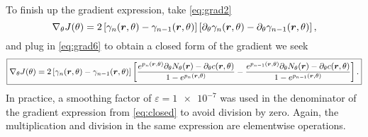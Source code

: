 To finish up the gradient expression, take \autoref{eq:grad2}
\begin{equation*}
    \nabla_{\theta} J(\theta) = 2 \left[\gamma_{n}(\bm{r}, \theta) - \gamma_{n-1}(\bm{r}, \theta) \right]
    \left[ \partial_{\theta} \gamma_{n}(\bm{r}, \theta) - \partial_{\theta} \gamma_{n-1}(\bm{r}, \theta) \right] ,
\end{equation*}
and plug in \autoref{eq:grad6} to obtain a closed form of the gradient we seek
\begin{equation}
    \boxed{
    \nabla_{\theta} J(\theta) = 2 \left[\gamma_{n}(\bm{r}, \theta) - \gamma_{n-1}(\bm{r}, \theta) \right]
    \left[ \frac{e^{p_{n}(\bm{r}, \theta)} \partial_{\theta} N_{\theta}(\bm{r}) - \partial_{\theta} c(\bm{r}, \theta)}{1 - e^{p_{n}(\bm{r}, \theta)}} - \frac{e^{p_{n-1}(\bm{r}, \theta)} \partial_{\theta} N_{\theta}(\bm{r}) - \partial_{\theta} c(\bm{r}, \theta)}{1 - e^{p_{n-1}(\bm{r}, \theta)}} \right] .
    }
    \label{eq:closed}
\end{equation}
In practice, a smoothing factor of $\varepsilon=\num{1e-7}$ was used in the denominator of 
the gradient expression from \autoref{eq:closed} to avoid division by zero. Again, the 
multiplication and division in the same expression are elementwise operations.